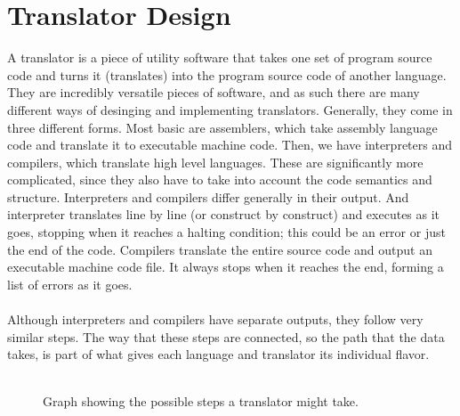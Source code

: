 \documentclass[a4paper, 11pt]{report}
\begin{document}
\section{Translator Design}\label{sec:translator-design}
A translator is a piece of utility software that takes one set of program source code and turns it (translates) into the program source code of another language. They are incredibly versatile pieces of software, and as such there are many different ways of desinging and implementing translators. Generally, they come in three different forms. Most basic are assemblers, which take assembly language code and translate it to executable machine code. Then, we have interpreters and compilers, which translate high level languages. These are significantly more complicated, since they also have to take into account the code semantics and structure. Interpreters and compilers differ generally in their output. And interpreter translates line by line (or construct by construct) and executes as it goes, stopping when it reaches a halting condition; this could be an error or just the end of the code. Compilers translate the entire source code and output an executable machine code file. It always stops when it reaches the end, forming a list of errors as it goes.\\
\\
Although interpreters and compilers have separate outputs, they follow very similar steps. The way that these steps are connected, so the path that the data takes, is part of what gives each language and translator its individual flavor.\\
\\
\begin{figure}[ht]
\centering
{}
\label{fig:translator-graph}
\caption{Graph showing the possible steps a translator might take.}
\end{figure}
\end{document}
